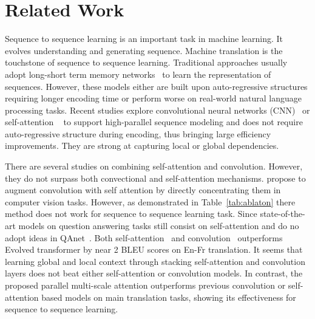 \documentclass{article} %
\begin{document}
\section{Related Work}
Sequence to sequence learning is an important task in machine learning. It evolves understanding and generating sequence. Machine translation is the touchstone of sequence to sequence learning. Traditional approaches usually adopt long-short term memory networks~\citep{sutskever2014sequence,ma-etal-2018-bag}  to learn the representation of sequences. However, these models either are built upon auto-regressive structures requiring longer encoding time or perform worse on real-world natural language processing tasks.
Recent studies  explore convolutional neural networks (CNN)~\citep{gehring2017convolutional} or self-attention ~\citep{vaswani2017attention} to  support high-parallel sequence modeling and does not require auto-regressive structure during encoding, thus bringing large efficiency improvements. They are strong at capturing local or global dependencies.


There are several studies on combining self-attention and convolution. However, they do not surpass both convectional and self-attention mechanisms.  \citet{sukhbaatar2019augmenting} propose to augment convolution with self attention by directly concentrating them in computer vision tasks.  However, as demonstrated in Table~\ref{tab:ablaton} there method does not work for sequence to sequence learning task. Since state-of-the-art models on question answering tasks still consist on self-attention and do no adopt ideas in QAnet~\citep{yu2018qanet}. Both self-attention~\citep{ott2018scaling} and convolution~\citep{wu2019pay} outperforms Evolved transformer by near 2 BLEU scores on En-Fr translation. It seems that learning global and local context through stacking self-attention and convolution  layers does not beat either self-attention or convolution models. In contrast, the proposed parallel multi-scale attention outperforms  previous convolution or self-attention  based models  on main translation tasks, showing its effectiveness for sequence to sequence learning.


\end{document}
